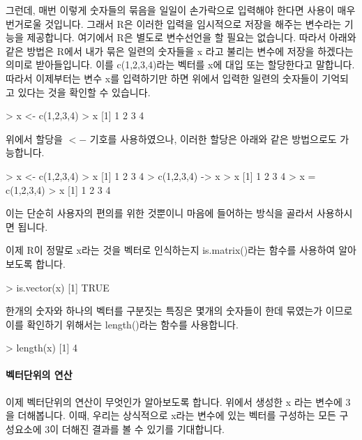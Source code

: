 그런데, 매번 이렇게 숫자들의 묶음을 일일이 손가락으로 입력해야 한다면 사용이 매우 번거로울 것입니다. 
그래서 R은 이러한 입력을 임시적으로 저장을 해주는 변수라는 기능을 제공합니다. 여기에서 R은 별도로 변수선언을 할 필요는 없습니다.
따라서 아래와 같은 방법은 R에서 내가 묶은 일련의 숫자들을 x 라고 불리는 변수에 저장을 하겠다는 의미로 받아들입니다.
이를 c(1,2,3,4)라는 벡터를 x에 대입 또는 할당한다고 말합니다.
따라서 이제부터는 변수 x를 입력하기만 하면 위에서 입력한 일련의 숫자들이 기억되고 있다는 것을 확인할 수 있습니다. 

\begin{Schunk}
\begin{Soutput}
> x <- c(1,2,3,4)
> x
[1] 1 2 3 4
\end{Soutput}
\end{Schunk}

위에서 할당을 $<-$ 기호를 사용하였으나, 이러한 할당은 아래와 같은 방법으로도 가능합니다. 

\begin{Schunk}
	\begin{Soutput}
> x <- c(1,2,3,4)
> x
[1] 1 2 3 4
> c(1,2,3,4) -> x
> x
[1] 1 2 3 4
> x = c(1,2,3,4)		
> x
[1] 1 2 3 4
\end{Soutput}
\end{Schunk}

이는 단순히 사용자의 편의를 위한 것뿐이니 마음에 들어하는 방식을 골라서 사용하시면 됩니다. 

이제 R이 정말로 x라는 것을 벡터로 인식하는지 is.matrix()라는 함수를 사용하여 알아보도록 합니다. 

\begin{Schunk}
\begin{Soutput}
> is.vector(x)
[1] TRUE
\end{Soutput}
\end{Schunk}

한개의 숫자와 하나의 벡터를 구분짓는 특징은 몇개의 숫자들이 한데 묶였는가 이므로 이를 확인하기 위해서는 length()라는 함수를 사용합니다. 

\begin{Schunk}
\begin{Soutput}
> length(x)
[1] 4
\end{Soutput}
\end{Schunk}

\paragraph{벡터단위의 연산}  이제 벡터단위의 연산이 무엇인가 알아보도록 합니다. 
위에서 생성한 x 라는 변수에 3 을 더해봅니다. 
이때, 우리는 상식적으로 x라는 변수에 있는 벡터를 구성하는 모든 구성요소에 3이 더해진 결과를 볼 수 있기를 기대합니다. 

